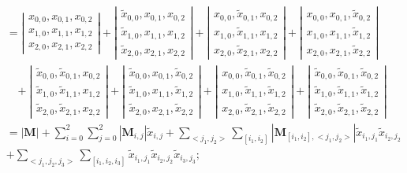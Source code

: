 \documentclass[twoside]{article}
\numberwithin{equation}{section}
\newcommand{\eqspace}{\;\;\;}
\begin{document}
\begin{align*}
 &= \left| \begin{matrix} 
        	x_{0,0}, x_{0,1}, x_{0,2} \\ 
			x_{1,0}, x_{1,1}, x_{1,2} \\ 
			x_{2,0}, x_{2,1}, x_{2,2} \end{matrix} \right|
	  + \left| \begin{matrix} 
	  		\tilde{x}_{0,0}, x_{0,1}, x_{0,2} \\ 
			\tilde{x}_{1,0}, x_{1,1}, x_{1,2} \\ 
			\tilde{x}_{2,0}, x_{2,1}, x_{2,2} \end{matrix} \right|	
	  + \left| \begin{matrix} 
	  		x_{0,0}, \tilde{x}_{0,1}, x_{0,2} \\ 
			x_{1,0}, \tilde{x}_{1,1}, x_{1,2} \\ 
			x_{2,0}, \tilde{x}_{2,1}, x_{2,2} \end{matrix} \right|
      + \left| \begin{matrix} 
      		x_{0,0}, x_{0,1}, \tilde{x}_{0,2}  \\
			x_{1,0}, x_{1,1}, \tilde{x}_{1,2} \\ 
			x_{2,0}, x_{2,1}, \tilde{x}_{2,2} \end{matrix} \right| \\
	  &\eqspace + \left| \begin{matrix} 
	  		\tilde{x}_{0,0}, \tilde{x}_{0,1}, x_{0,2} \\ 
			\tilde{x}_{1,0}, \tilde{x}_{1,1}, x_{1,2} \\ 
			\tilde{x}_{2,0}, \tilde{x}_{2,1}, x_{2,2} \end{matrix} \right|
	  + \left| \begin{matrix} 
	  		\tilde{x}_{0,0}, x_{0,1}, \tilde{x}_{0,2}  \\
			\tilde{x}_{1,0}, x_{1,1}, \tilde{x}_{1,2} \\ 
			\tilde{x}_{2,0}, x_{2,1}, \tilde{x}_{2,2} \end{matrix} \right|
	  + \left| \begin{matrix} 
	  		x_{0,0}, \tilde{x}_{0,1}, \tilde{x}_{0,2} \\
			x_{1,0}, \tilde{x}_{1,1}, \tilde{x}_{1,2} \\ 
			x_{2,0}, \tilde{x}_{2,1}, \tilde{x}_{2,2} \end{matrix} \right|
	  + \left| \begin{matrix} 
	  		\tilde{x}_{0,0}, \tilde{x}_{0,1}, \tilde{x}_{0,2} \\
			\tilde{x}_{1,0}, \tilde{x}_{1,1}, \tilde{x}_{1,2} \\ 
			\tilde{x}_{2,0}, \tilde{x}_{2,1}, \tilde{x}_{2,2} \end{matrix} \right| \\
 &= |\mathbf{M}| + \sum_{i = 0}^{2} \sum_{j = 0}^{2} |\mathbf{M}_{i,j}| \tilde{x}_{i,j} 
 		+ \sum_{<j_1,j_2>} \sum_{[i_1,i_2]} |\mathbf{M}_{[i_1,i_2], <j_1,j_2>}| \tilde{x}_{i_1,j_1} \tilde{x}_{i_2,j_2} \\
 &+ \sum_{<j_1,j_2,j_3>} \sum_{[i_1,i_2,i_3]} \tilde{x}_{i_1,j_1} \tilde{x}_{i_2,j_2} \tilde{x}_{i_3,j_3};
\end{align*}
\end{document}
